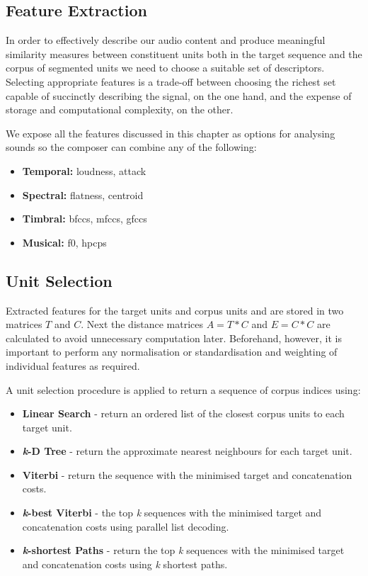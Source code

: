 {{{{{{{{\subsection{Feature Extraction}

In order to effectively describe our audio content and produce meaningful similarity measures between constituent units both in the target sequence and the corpus of segmented units we need to choose a suitable set of descriptors. Selecting appropriate features is a trade-off between choosing the richest set capable of succinctly describing the signal, on the one hand, and the expense of storage and computational complexity, on the other. 

We expose all the features discussed in this chapter as options for analysing sounds so the composer can combine any of the following:

\begin{itemize}
\item \textbf{Temporal:} loudness, attack
\item \textbf{Spectral:} flatness, centroid
\item \textbf{Timbral:} \acrshort{bfcc}s, \acrshort{mfcc}s, \acrshort{gfcc}s
\item \textbf{Musical:} f0, \acrshort{hpcp}s
\end{itemize}

\subsection{Unit Selection}

Extracted features for the target units and corpus units and are stored in two matrices $T$ and $C$. Next the distance matrices $A = T * C$  and $E = C * C$ are calculated to avoid unnecessary computation later. Beforehand, however, it is important to perform any normalisation or standardisation and weighting of individual features as required.

A unit selection procedure is applied to return a sequence of corpus indices using:

\begin{itemize}
\item \textbf{Linear Search} - return an ordered list of the closest corpus units to each target unit.
\item \textbf{\textit{k}-D Tree} - return the approximate nearest neighbours for each target unit.
\item \textbf{Viterbi }- return the sequence with the minimised target and concatenation costs.
\item \textbf{\textit{k}-best Viterbi} - the top \textit{k} sequences with the minimised target and concatenation costs using parallel list decoding.
\item \textbf{\textit{k}-shortest Paths} - return the top \textit{k} sequences with the minimised target and concatenation costs using \textit{k} shortest paths.
\end{itemize}

}}}}}}}}

